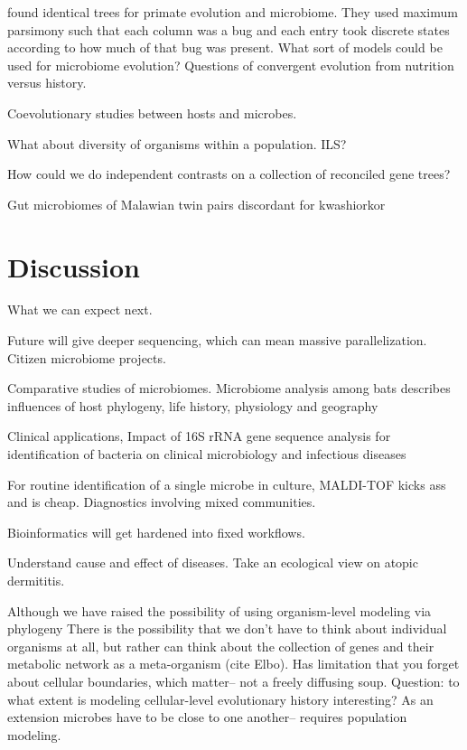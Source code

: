 \documentclass{amsart}
\begin{document}
\citet{ochman2010evolutionary} found identical trees for primate evolution and microbiome.
They used maximum parsimony such that each column was a bug and each entry took discrete states according to how much of that bug was present.
What sort of models could be used for microbiome evolution?
Questions of convergent evolution from nutrition versus history.

Coevolutionary studies between hosts and microbes.

What about diversity of organisms within a population.
ILS?

How could we do independent contrasts on a collection of reconciled gene trees?

Gut microbiomes of Malawian twin pairs discordant for kwashiorkor \cite{smith2013gut}

\section{Discussion}
What we can expect next.

Future will give deeper sequencing, which can mean massive parallelization.
Citizen microbiome projects.

Comparative studies of microbiomes.
\citep{phillips2012microbiome}
Microbiome analysis among bats describes influences of host phylogeny, life history, physiology and geography

Clinical applications,
\citep{clarridge2004}
{{I}mpact of 16{S} r{RNA} gene sequence analysis for identification of bacteria on clinical microbiology and infectious diseases}

For routine identification of a single microbe in culture, MALDI-TOF kicks ass and is cheap.
Diagnostics involving mixed communities.

Bioinformatics will get hardened into fixed workflows.

Understand cause and effect of diseases.
Take an ecological view on atopic dermititis.

Although we have raised the possibility of using organism-level modeling via phylogeny
There is the possibility that we don't have to think about individual organisms at all, but rather can think about the collection of genes and their metabolic network as a meta-organism (cite Elbo).
Has limitation that you forget about cellular boundaries, which matter-- not a freely diffusing soup.
Question: to what extent is modeling cellular-level evolutionary history interesting?
As an extension microbes have to be close to one another-- requires population modeling.
\end{document}
